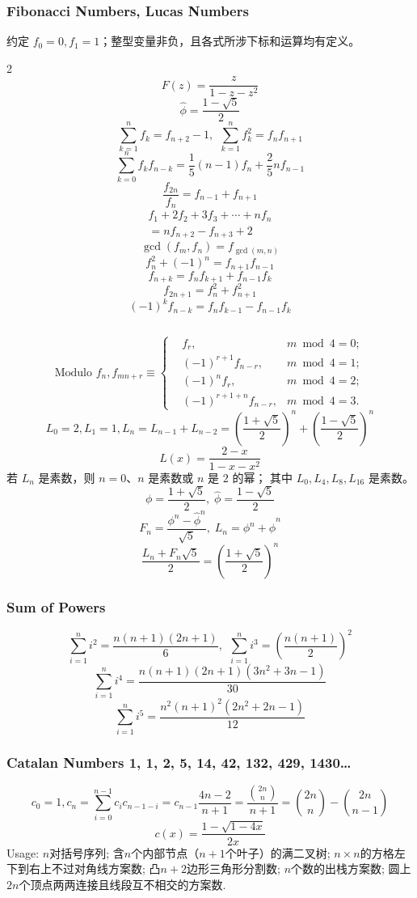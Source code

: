 \begin{footnotesize}
\subsubsection{Fibonacci Numbers, Lucas Numbers}
约定 $f_0=0,f_1=1$；整型变量非负，且各式所涉下标和运算均有定义。
\begin{multicols*}{2}
\[ F(z) = \frac{z}{1-z-z^2} \]
\[ \hat{\phi} = \frac{1-\sqrt{5}}{2} \]
\[ \sum_{k=1}^nf_k = f_{n+2}-1,\ \ \sum_{k=1}^nf^2_k = f_nf_{n+1} \]
\[ \sum_{k=0}^nf_kf_{n-k} = \frac{1}{5}(n-1)f_n+\frac{2}{5}nf_{n-1} \]
\[ \frac{f_{2n}}{f_n} = f_{n-1} + f_{n+1}\]
\[\begin{gathered}
	f_1+2f_2+3f_3+\cdots+nf_n \\
	=nf_{n+2}-f_{n+3}+2
\end{gathered}\]
\[ \gcd(f_m,f_n)=f_{\gcd(m,n)}\]
\[ f^2_n + (-1)^n = f_{n+1}f_{n-1} \]
\[ f_{n+k} = f_nf_{k+1} + f_{n-1}f_k \]
\[ f_{2n+1} = f^2_n+f^2_{n+1} \]
\[ (-1)^kf_{n-k} = f_{n}f_{k-1} - f_{n-1}f_{k} \]
\begin{small}
\inputminted{python3}{sections/NumberTheory/assets/tbr/fib.py}
\end{small}
\end{multicols*}
\[ \text{Modulo }f_n, f_{mn+r} \equiv \left\{
\begin{aligned}
&f_r,& m \bmod 4 = 0; \\
&(-1)^{r+1}f_{n-r},& m \bmod 4 = 1; \\
&(-1)^nf_r,& m \bmod 4 = 2; \\
&(-1)^{r+1+n}f_{n-r},& m \bmod 4 = 3.
\end{aligned}
\right.
\]
\[ L_0=2,L_1=1,L_n=L_{n-1}+L_{n-2}=(\frac{1+\sqrt{5}}{2})^n+(\frac{1-\sqrt{5}}{2})^n \]
\[ L(x)=\frac{2-x}{1-x-x^2} \]
若 $L_n$ 是素数，则 $n=0$、$n$ 是素数或 $n$ 是 $2$ 的幂；
其中 $L_0,L_4,L_8,L_{16}$ 是素数。
$$\phi = \frac {1 + \sqrt 5} 2, \; \hat\phi = \frac {1 - \sqrt 5} 2$$
$$F_n = \frac {\phi^n - {\hat\phi} ^ n} {\sqrt 5}, \; L_n = \phi ^ n + {\hat\phi} ^ n$$
$$\frac {L_n + F_n \sqrt 5} 2 = \left( \frac {1 + \sqrt 5} 2 \right) ^ n$$

\subsubsection{Sum of Powers}
\[\sum_{i=1}^ni^2=\frac{n(n+1)(2n+1)}{6},\ \ \sum_{i=1}^ni^3=\left(\frac{n(n+1)}{2}\right)^2\]
\[\sum_{i=1}^ni^4=\frac{n(n+1)(2n+1)(3n^2+3n-1)}{30}\]
\[\sum_{i=1}^ni^5=\frac{n^2(n+1)^2(2n^2+2n-1)}{12}\]

\subsubsection{Catalan Numbers 1, 1, 2, 5, 14, 42, 132, 429, 1430\dots}
\[c_{0}=1,c_n=\sum_{i=0}^{n-1}c_ic_{n-1-i}=c_{n-1}\frac{4n-2}{n+1}=\frac{\binom{2n}{n}}{n+1}=\binom{2n}{n}-\binom{2n}{n-1}\]
\[ c(x)=\frac{1-\sqrt{1-4x}}{2x}\]
Usage: $n$对括号序列; 含$n$个内部节点（$n+1$个叶子）的满二叉树;
$n\times n$的方格左下到右上不过对角线方案数; 凸$n+2$边形三角形分割数;
$n$个数的出栈方案数; 圆上$2n$个顶点两两连接且线段互不相交的方案数.

\end{footnotesize}
